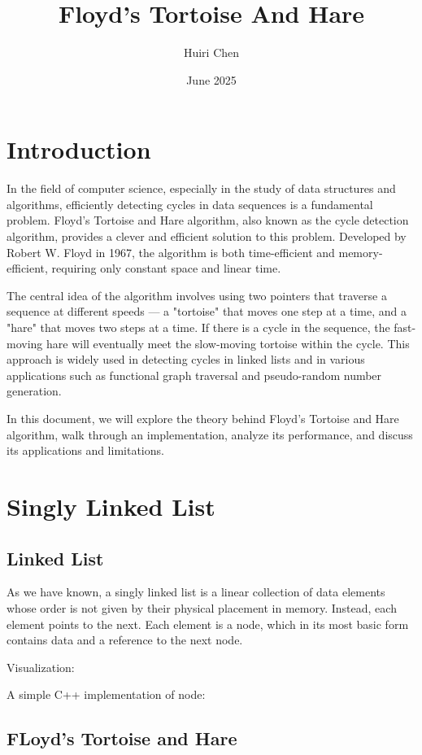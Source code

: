 \documentclass[12pt, letterpaper]{article}
\date{June 2025}
\begin{document}
\title{Floyd's Tortoise And Hare}
\author{Huiri Chen}

\maketitle

\section{Introduction}  
In the field of computer science, especially in the study of data structures and algorithms, efficiently detecting cycles in data sequences is a fundamental problem. Floyd's Tortoise and Hare algorithm, also known as the cycle detection algorithm, provides a clever and efficient solution to this problem. Developed by Robert W. Floyd in 1967, the algorithm is both time-efficient and memory-efficient, requiring only constant space and linear time.

The central idea of the algorithm involves using two pointers that traverse a sequence at different speeds — a "tortoise" that moves one step at a time, and a "hare" that moves two steps at a time. If there is a cycle in the sequence, the fast-moving hare will eventually meet the slow-moving tortoise within the cycle. This approach is widely used in detecting cycles in linked lists and in various applications such as functional graph traversal and pseudo-random number generation.

In this document, we will explore the theory behind Floyd's Tortoise and Hare algorithm, walk through an implementation, analyze its performance, and discuss its applications and limitations.

\section{Singly Linked List}
\subsection{Linked List}
As we have known, a singly linked list is a linear collection of data elements whose order is not given by their physical placement in memory. Instead, each element points to the next. Each element is a node, which in its most basic form contains data and a reference to the next node.

Visualization:

A simple C++ implementation of node:
\subsection{FLoyd's Tortoise and Hare}
\end{document}
